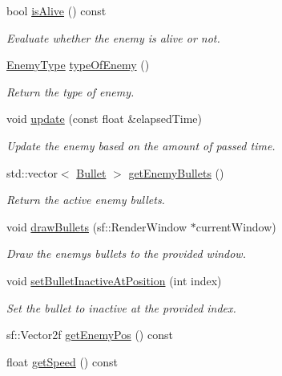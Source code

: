 \begin{DoxyCompactItemize}
bool \hyperlink{class_enemy_a2801f42818600b19a7381dd2d1635af8}{is\+Alive} () const
\begin{DoxyCompactList}\small\item\em Evaluate whether the enemy is alive or not. \end{DoxyCompactList}\item 
\hyperlink{_enemy_8h_ac3e413a86119db4b031458c7259e268e}{Enemy\+Type} \hyperlink{class_enemy_a7d8b3efe6d46b3c77446fe7f2a282a19}{type\+Of\+Enemy} ()
\begin{DoxyCompactList}\small\item\em Return the type of enemy. \end{DoxyCompactList}\item 
void \hyperlink{class_enemy_a541b72a32e4a0217d58d1ee573c2f23a}{update} (const float \&elapsed\+Time)
\begin{DoxyCompactList}\small\item\em Update the enemy based on the amount of passed time. \end{DoxyCompactList}\item 
std\+::vector$<$ \hyperlink{class_bullet}{Bullet} $>$ \hyperlink{class_enemy_a849b23a3f78625911b0969506426d4da}{get\+Enemy\+Bullets} ()
\begin{DoxyCompactList}\small\item\em Return the active enemy bullets. \end{DoxyCompactList}\item 
void \hyperlink{class_enemy_ac0e1068fc766428d69d55b18e0fce0ca}{draw\+Bullets} (sf\+::\+Render\+Window $\ast$current\+Window)
\begin{DoxyCompactList}\small\item\em Draw the enemy\textquotesingle{}s bullets to the provided window. \end{DoxyCompactList}\item 
void \hyperlink{class_enemy_a02e1cacf8fad39bbcc28271a53637024}{set\+Bullet\+Inactive\+At\+Position} (int index)
\begin{DoxyCompactList}\small\item\em Set the bullet to inactive at the provided index. \end{DoxyCompactList}\item 
sf\+::\+Vector2f \hyperlink{class_enemy_a9f5b6b7b70f7f3532e82eebcab2e26e8}{get\+Enemy\+Pos} () const
\item 
float \hyperlink{class_enemy_a342051a8cf9fe6e329774e37af486fca}{get\+Speed} () const
\item 

\end{DoxyCompactItemize}
